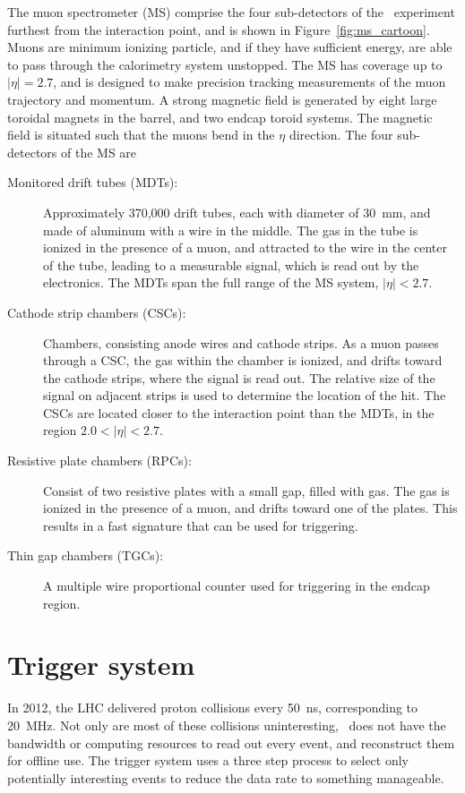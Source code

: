 The muon spectrometer (MS) comprise the four sub-detectors of the
\atlas\ experiment furthest from the interaction point, and is shown in
Figure~\ref{fig:ms_cartoon}.
Muons are minimum ionizing particle, and if they have sufficient energy, are
able to pass through the calorimetry system unstopped.
The MS has coverage up to $|\eta| = 2.7$, and is designed to make precision
tracking measurements of the muon trajectory and momentum.
A strong magnetic field is generated by eight large toroidal magnets in the
barrel, and two endcap toroid systems.
The magnetic field is situated such that the muons bend in the $\eta$
direction.
The four sub-detectors of the MS are
\begin{description}
  \item[Monitored drift tubes (MDTs):] 
    Approximately 370,000 drift tubes, each with diameter of 30~mm, and made of
    aluminum with a wire in the middle.
    The gas in the tube is ionized in the presence of a muon, and attracted to
    the wire in the center of the tube, leading to a measurable signal, which
    is read out by the electronics.
    The MDTs span the full range of the MS system, $|\eta| < 2.7$.
  \item[Cathode strip chambers (CSCs):] 
    Chambers, consisting anode wires and cathode strips.
    As a muon passes through a CSC, the gas within the chamber is ionized, and
    drifts toward the cathode strips, where the signal is read out.
    The relative size of the signal on adjacent strips is used to determine the
    location of the hit.
    The CSCs are located closer to the interaction point than the MDTs, in the
    region $2.0 < |\eta| < 2.7$.
  \item[Resistive plate chambers (RPCs):] 
    Consist of two resistive plates with a small gap, filled with gas.
    The gas is ionized in the presence of a muon, and drifts toward one of the
    plates.
    This results in a fast signature that can be used for triggering.
  \item[Thin gap chambers (TGCs):] 
    A multiple wire proportional counter used for triggering in the endcap
    region.
\end{description}

\FloatBarrier
\section{Trigger system}

In 2012, the LHC delivered proton collisions every 50~ns, corresponding to
20~MHz.
Not only are most of these collisions uninteresting, \atlas\ does not have
the bandwidth or computing resources to read out every event, and reconstruct
them for offline use.
The trigger system uses a three step process to select only potentially
interesting events to reduce the data rate to something manageable.

